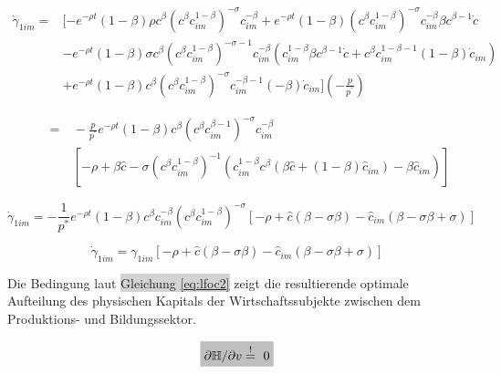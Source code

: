 	\begin{equation*}
		\begin{split}
			\dot{\gamma}_{1im} = &[- e^{- \rho t} (1- \beta) \rho c^{ \beta} ( c^{ \beta} c_{im}^{1- \beta})^{- \sigma} c_{im}^{- \beta} + e^{ - \rho t} (1- \beta)(c^{ \beta} c_{im}^{1- \beta})^{- \sigma} c_{im}^{-\beta} \beta c^{ \beta - 1} \dot{c}\\
			& - e^{- \rho t} (1 - \beta) \sigma c^{ \beta} (c^{ \beta} c_{im}^{1- \beta})^{- \sigma - 1} c_{im}^{- \beta}(c_{im}^{1- \beta} \beta c^{ \beta -1} \dot{c} + c^{ \beta} c_{im}^{1- \beta -1} (1- \beta) \dot{c}_{im}) \\
			& + e^{- \rho t} (1- \beta) c^{ \beta} ( c^{ \beta} c_{im}^{1- \beta})^{- \sigma} c_{im}^{- \beta -1}(- \beta) \dot{c}_{im} ] (-\frac{p}{p^{^*}})
		\end{split}
	\end{equation*}


	\begin{equation*}
		\begin{split}
			\qquad=&~-\frac{p}{p^{^*}} e^{- \rho t} (1- \beta) c^{\beta}(c^{\beta} c_{im}^{\beta -1})^{- \sigma} c_{im}^{- \beta}\\
			&~\left[-\rho + \beta \hat{c} - \sigma(c^{\beta} c_{im}^{1- \beta})^{-1}(c_{im}^{1- \beta} c^{\beta}(\beta \hat{c} + (1- \beta) \hat{c}_{im}) - \beta \hat{c}_{im})\right]
		\end{split}
	\end{equation*}

	\begin{equation}
		\dot{\gamma}_{1im}=-\frac{1}{p^*}e^{-\rho t}(1-\beta) c^{\beta}c_{im}^{-\beta}(c^\beta c_{im}^{1-\beta})^{-\sigma}[-\rho+\hat{c}(\beta-\sigma\beta)-\hat{c}_{im}(\beta-\sigma\beta+\sigma)]\label{eq:lfoc1cim}
	\end{equation}


	\begin{equation}
		\dot{\gamma}_{1im}=\gamma_{1im}[-\rho+\hat{c}(\beta-\sigma\beta)-\hat{c}_{im}(\beta-\sigma\beta+\sigma)]\label{eq:foc1cim}
	\end{equation}


Die Bedingung laut \colorbox{lightgray}{Gleichung \eqref{eq:lfoc2}} zeigt die resultierende optimale Aufteilung des physischen Kapitals der Wirtschaftssubjekte zwischen dem Produktions- und Bildungssektor.


	\begin{equation*}
		\colorbox{lightgray}{$\partial\mathbb{H}/\partial v\overset{!}{=}~0$}
	\end{equation*}


